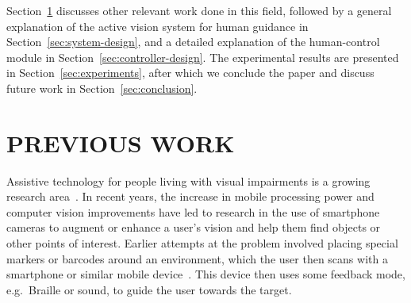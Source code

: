 \documentclass[a4paper, twoside]{article}
\begin{document}
Section~\ref{sec:previous-work} discusses other relevant work done in this field, followed by a general explanation of the active vision system for human guidance in Section~\ref{sec:system-design}, and a detailed explanation of the human-control module in Section~\ref{sec:controller-design}. The experimental results are presented in Section~\ref{sec:experiments}, after which we conclude the paper and discuss future work in Section~\ref{sec:conclusion}. 

\section{\uppercase{Previous Work}}\label{sec:previous-work}

\noindent Assistive technology for people living with visual impairments is a growing research area~\cite{Manduchi2012,khoo2016multimodal}. In recent years, the increase in mobile processing power and computer vision improvements have led to research in the use of smartphone cameras to augment or enhance a user's vision and help them find objects or other points of interest. Earlier attempts at the problem involved placing special markers or barcodes around an environment, which the user then scans with a smartphone or similar mobile device~\cite{gude2013blind,iannizzotto2005badge3d,manduchi2012mobile}. This device then uses some feedback mode, e.g.\ Braille or sound, to guide the user towards the target. %
\end{document}
